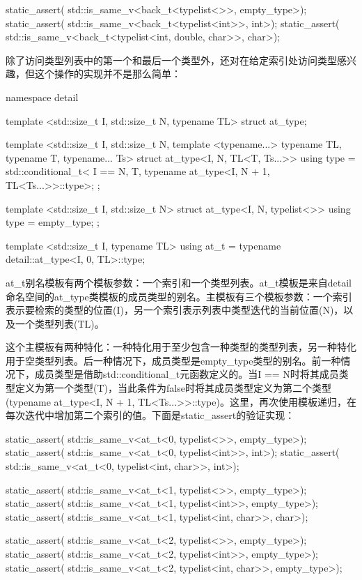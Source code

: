 \begin{cpp}
static_assert(
	std::is_same_v<back_t<typelist<>>, empty_type>);
static_assert(
	std::is_same_v<back_t<typelist<int>>, int>);
static_assert(
	std::is_same_v<back_t<typelist<int, double, char>>,
				   char>);
\end{cpp}

除了访问类型列表中的第一个和最后一个类型外，还对在给定索引处访问类型感兴趣，但这个操作的实现并不是那么简单：

\begin{cpp}
namespace detail
{
	template <std::size_t I, std::size_t N, typename TL>
	struct at_type;
	
	template <std::size_t I, std::size_t N,
			  template <typename...> typename TL,
			  typename T, typename... Ts>
	struct at_type<I, N, TL<T, Ts...>>
	{
		using type =
		std::conditional_t<
		I == N,
		T,
		typename at_type<I, N + 1, TL<Ts...>>::type>;
	};

	template <std::size_t I, std::size_t N>
	struct at_type<I, N, typelist<>>
	{
		using type = empty_type;
	};
}

template <std::size_t I, typename TL>
using at_t = typename detail::at_type<I, 0, TL>::type;
\end{cpp}

at\_t别名模板有两个模板参数：一个索引和一个类型列表。at\_t模板是来自detail命名空间的at\_type类模板的成员类型的别名。主模板有三个模板参数：一个索引表示要检索的类型的位置(I)，另一个索引表示列表中类型迭代的当前位置(N)，以及一个类型列表(TL)。

这个主模板有两种特化：一种特化用于至少包含一种类型的类型列表，另一种特化用于空类型列表。后一种情况下，成员类型是empty\_type类型的别名。前一种情况下，成员类型是借助std::conditional\_t元函数定义的。当I == N时将其成员类型定义为第一个类型(T)，当此条件为false时将其成员类型定义为第二个类型(typename at\_type<I, N + 1, TL<Ts...>{}>::type)。这里，再次使用模板递归，在每次迭代中增加第二个索引的值。下面是static\_assert的验证实现：

\begin{cpp}
static_assert(
	std::is_same_v<at_t<0, typelist<>>, empty_type>);
static_assert(
	std::is_same_v<at_t<0, typelist<int>>, int>);
static_assert(
	std::is_same_v<at_t<0, typelist<int, char>>, int>);
	
static_assert(
	std::is_same_v<at_t<1, typelist<>>, empty_type>);
static_assert(
	std::is_same_v<at_t<1, typelist<int>>, empty_type>);
static_assert(
	std::is_same_v<at_t<1, typelist<int, char>>, char>);
	
static_assert(
	std::is_same_v<at_t<2, typelist<>>, empty_type>);
static_assert(
	std::is_same_v<at_t<2, typelist<int>>, empty_type>);
static_assert(
	std::is_same_v<at_t<2, typelist<int, char>>,
				   empty_type>);
\end{cpp}

